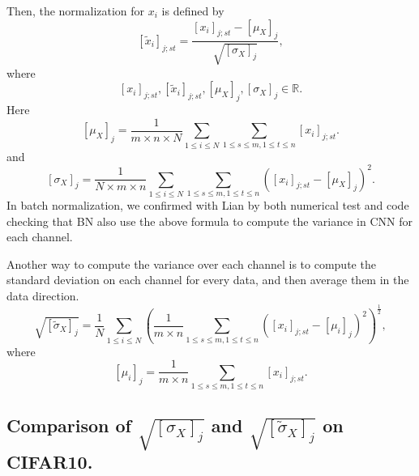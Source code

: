 Then, the normalization for $x_i$ is defined by
\begin{equation}\label{key}
[\tilde x_i]_{{j;st}} = \frac{[x_i]_{{j;st}} - [\mu_X]_j }{\sqrt{[\sigma_X]_j}},
\end{equation}
where %
\begin{equation}\label{key}
[x_i]_{{j;st}}, [\tilde x_i]_{{j;st}}, [\mu_X]_j, [\sigma_X]_j \in \mathbb{R}.
\end{equation}
Here 
\begin{equation}\label{key}
[\mu_X]_j = \frac{1}{m\times n\times N} \sum_{ 1 \le i \le N} \sum_{1\le s \le m, 1 \le t \le n} [x_i]_{j;st}.
\end{equation}
and 
\begin{equation}\label{key}
[\sigma_X]_j = \frac{1}{ N \times m\times n} \sum_{ 1 \le i \le N} \sum_{1\le s \le m, 1 \le t \le n} ([x_i]_{j;st} -[\mu_X]_j )^2.
\end{equation}
In batch normalization, we confirmed with Lian by both numerical test and code checking that BN also use the above 
formula to compute the variance in CNN for each channel.


Another way to compute the variance over each channel is to compute the standard deviation on each channel for every data,
and then average them in the data direction.
\begin{equation}\label{key}
\sqrt{[\tilde \sigma_X]_j} = \frac{1}{ N} \sum_{ 1 \le i \le N}  \left( \frac{1}{m\times n}\sum_{1\le s \le m, 1 \le t \le n} ([x_i]_{j;st} - [\mu_i]_j )^2 \right)^{\frac{1}{2}},
\end{equation}
where
\begin{equation}\label{key}
[\mu_i]_j  = \frac{1}{m\times n} \sum_{1\le s \le m, 1 \le t \le n} [x_i]_{j;st}.
\end{equation}

\subsection{Comparison of $\sqrt{[\sigma_X]_j}$ and  $\sqrt{[\tilde \sigma_X]_j}$ on CIFAR10.}

